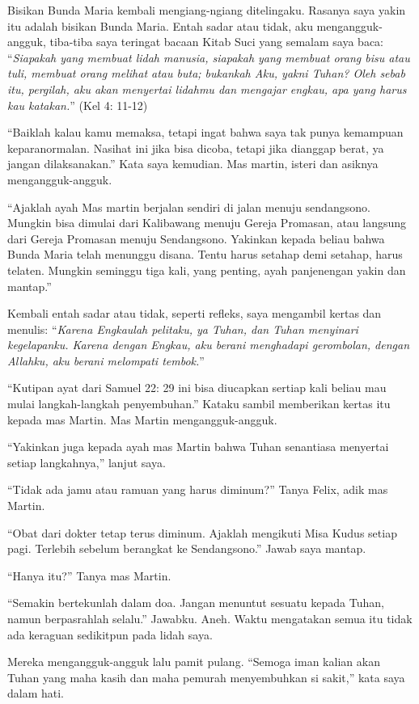 	Bisikan Bunda Maria kembali mengiang-ngiang ditelingaku. Rasanya saya yakin itu adalah bisikan Bunda Maria. Entah sadar atau tidak, aku mengangguk-angguk, tiba-tiba saya teringat bacaan Kitab Suci yang semalam saya baca: “\textit{Siapakah yang membuat lidah manusia, siapakah yang membuat orang bisu atau tuli, membuat orang melihat atau buta; bukankah Aku, yakni Tuhan? Oleh sebab itu, pergilah, aku akan menyertai lidahmu dan mengajar engkau, apa yang harus kau katakan.}” (Kel 4: 11-12)

	“Baiklah kalau kamu memaksa, tetapi ingat bahwa saya tak punya kemampuan keparanormalan. Nasihat ini jika bisa dicoba, tetapi jika dianggap berat, ya jangan dilaksanakan.” Kata saya kemudian. Mas martin, isteri dan asiknya mengangguk-angguk. 

	“Ajaklah ayah Mas martin berjalan sendiri di jalan menuju sendangsono. Mungkin bisa dimulai dari Kalibawang menuju Gereja Promasan, atau langsung dari Gereja Promasan menuju Sendangsono. Yakinkan kepada beliau bahwa Bunda Maria telah menunggu disana. Tentu harus setahap demi setahap, harus telaten. Mungkin seminggu tiga kali, yang penting, ayah panjenengan yakin dan mantap.”

	Kembali entah sadar atau tidak, seperti refleks,  saya mengambil kertas dan menulis: “\textit{Karena Engkaulah pelitaku, ya Tuhan, dan Tuhan menyinari kegelapanku. Karena dengan Engkau, aku berani menghadapi gerombolan, dengan Allahku, aku berani melompati tembok.}”  

	“Kutipan ayat dari Samuel 22: 29 ini bisa diucapkan sertiap kali beliau mau mulai langkah-langkah penyembuhan.” Kataku sambil memberikan kertas itu kepada mas Martin. Mas Martin mengangguk-angguk.

	“Yakinkan juga kepada ayah mas Martin bahwa Tuhan senantiasa menyertai setiap langkahnya,” lanjut saya.

	“Tidak ada jamu atau ramuan yang harus diminum?” Tanya Felix, adik mas Martin.

	“Obat dari dokter tetap  terus diminum. Ajaklah mengikuti Misa Kudus setiap pagi. Terlebih sebelum berangkat ke Sendangsono.” Jawab saya mantap.

	“Hanya itu?” Tanya mas Martin.

	“Semakin bertekunlah dalam doa. Jangan menuntut sesuatu kepada Tuhan, namun berpasrahlah selalu.” Jawabku. Aneh. Waktu mengatakan semua itu tidak ada keraguan sedikitpun pada lidah saya.

Mereka mengangguk-angguk lalu pamit pulang.
“Semoga iman kalian akan Tuhan yang maha kasih dan maha pemurah menyembuhkan si sakit,” kata saya dalam hati.

